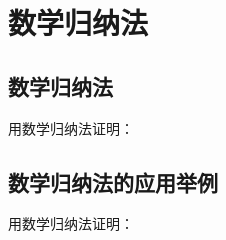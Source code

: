 \begin{Exercise}
  \begin{question}
    \item 
    \item 
    \item 
    \item 
    \item 
    \item 
    \item 
    \item 
    \item 
    \item 
    \item 
    \item 
    \item 
    \item 
    \item 
    \item 
    \item 
    \item 
    \item 
    \item 
  \end{question}
\end{Exercise}

\section{数学归纳法}
\subsection{数学归纳法}
\begin{Practice}
  用数学归纳法证明：
  \begin{question}
    \item 
    \item 
    \item 
  \end{question}
\end{Practice}

\subsection{数学归纳法的应用举例}
\begin{Practice}
  用数学归纳法证明：
  \begin{question}
    \item 
    \item 
    \item 
    \item 
  \end{question}
\end{Practice}

